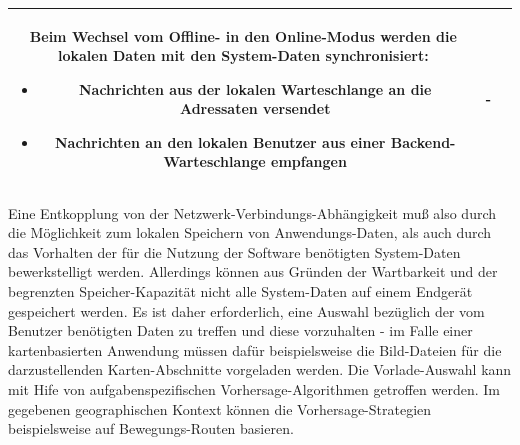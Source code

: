 \begin{table}[H]
\begin{adjustwidth}{-1.7cm}{1.7cm}
\begin{tabulary}{18cm}{|C|M|M|}
Beim Wechsel vom Offline- in den Online-Modus werden die lokalen Daten mit den System-Daten synchronisiert:
\begin{itemize}[leftmargin=*,noitemsep,topsep=1ex,parsep=0pt,partopsep=0pt]
	\item Nachrichten aus der lokalen Warteschlange an die Adressaten versendet
	\item Nachrichten an den lokalen Benutzer aus einer Backend-Warteschlange empfangen
\end{itemize}
				\endgroup
&   \\ \hline
		\end{tabulary}
  		\end{adjustwidth}
	\end{table}
\vspace{2ex}
\enlargethispage{3\baselineskip} %
\noindent
Eine Entkopplung von der Netzwerk-Verbindungs-Abhängigkeit muß also durch die Möglichkeit zum lokalen Speichern von Anwendungs-Daten, als auch durch das Vorhalten der für die Nutzung der Software benötigten System-Daten bewerkstelligt werden. Allerdings können aus Gründen der Wartbarkeit und der begrenzten Speicher-Kapazität nicht alle System-Daten auf einem Endgerät gespeichert werden. Es ist daher erforderlich, eine Auswahl bezüglich der vom Benutzer benötigten Daten zu treffen und diese vorzuhalten - im Falle einer kartenbasierten Anwendung müssen dafür beispielsweise die Bild-Dateien für die darzustellenden Karten-Abschnitte vorgeladen werden. Die Vorlade-Auswahl kann mit Hife von aufgabenspezifischen Vorhersage-Algorithmen getroffen werden. Im gegebenen geographischen Kontext können die Vorhersage-Strategien beispielsweise auf Bewegungs-Routen basieren. 


